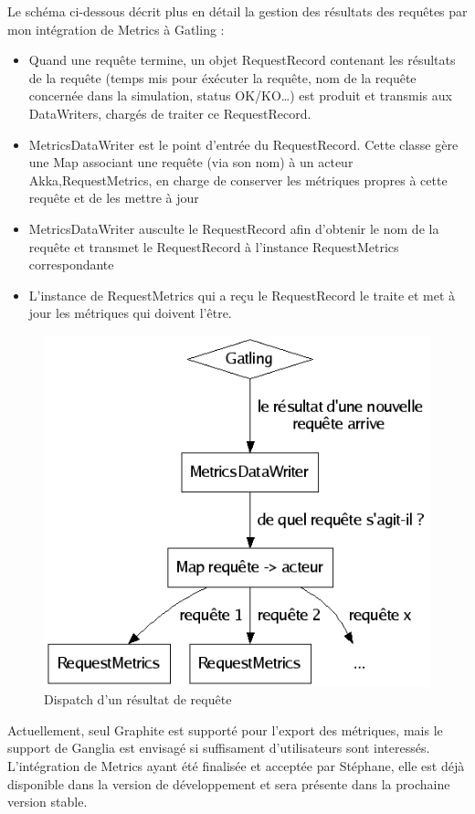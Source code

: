 Le schéma ci-dessous décrit plus en détail la gestion des résultats des requêtes par mon intégration de Metrics à Gatling : 
\begin{itemize}
	\item Quand une requête termine, un objet RequestRecord contenant les résultats de la requête (temps mis pour éxécuter la requête, nom de la requête concernée dans la simulation, status OK/KO\ldots) est produit et transmis aux DataWriters, chargés de traiter ce RequestRecord.
	\item MetricsDataWriter est le point d'entrée du RequestRecord. Cette classe gère une Map associant une requête (via son nom) à un acteur Akka,RequestMetrics, en charge de conserver les métriques propres à cette requête et de les mettre à jour
	\item 	MetricsDataWriter ausculte le RequestRecord afin d'obtenir le nom de la requête et transmet le RequestRecord à l'instance RequestMetrics correspondante
	\item L'instance de RequestMetrics qui a reçu le RequestRecord le traite et met à jour les métriques qui doivent l'être.\\
\end{itemize}
\newpage
\begin{figure}[h!]
	\centering
		\includegraphics[scale=0.5]{metrics.png}
	\caption{Dispatch d'un résultat de requête}
\end{figure}

Actuellement, seul Graphite est supporté pour l'export des métriques, mais le support de Ganglia est envisagé si suffisament d'utilisateurs sont interessés.\\
L'intégration de Metrics ayant été finalisée et acceptée par Stéphane, elle est déjà disponible dans la version de développement et sera présente dans la prochaine version stable.
